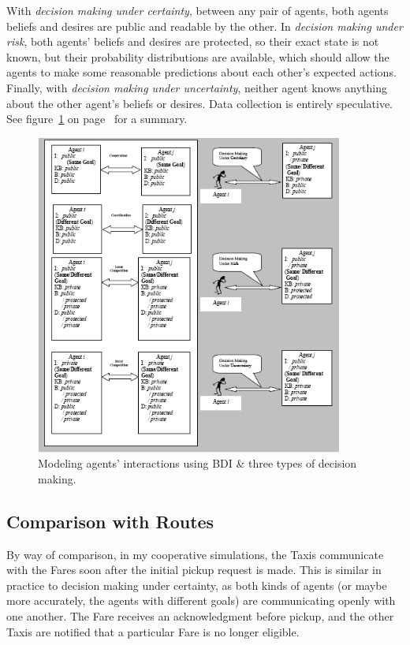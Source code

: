 \documentclass[11pt,letterpaper,onecolumn,twoside,openright,final]{report}
\begin{document}
With \emph{decision making under certainty}, between any pair of agents, both agents beliefs and desires are public and readable by the other.
In \emph{decision making under risk}, both agents' beliefs and desires are protected, so their exact state is not known, but their probability distributions are available, which should allow the agents to make some reasonable predictions about each other's expected actions.
Finally, with \emph{decision making under uncertainty}, neither agent knows anything about the other agent's beliefs or desires.
Data collection is entirely speculative. See figure~\ref{fig:uncertainty-management} on page~\pageref{fig:uncertainty-management} for a summary.

\begin{figure}[h]
  \includegraphics[width=0.9\textwidth]{figures/uncertainty-management}
  \caption{Modeling agents' interactions using BDI \& three types of decision making.}
  \label{fig:uncertainty-management}
\end{figure}

\subsection{Comparison with Routes}
By way of comparison, in my cooperative simulations, the Taxis communicate with the Fares soon after the initial pickup request is made.
This is similar in practice to decision making under certainty, as both kinds of agents (or maybe more accurately, the agents with different goals) are communicating openly with one another.
The Fare receives an acknowledgment before pickup, and the other Taxis are notified that a particular Fare is no longer eligible.
\end{document}
